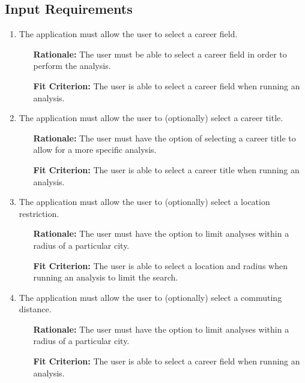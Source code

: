 \documentclass[english]{article}
\begin{document}
\subsection{Input Requirements}
\begin{enumerate}[\bf{FIR}1.]
	\item The application must allow the user to select a career field.
	\begin{enumerate}[leftmargin=1cm]
        \item [{\bf Rationale:}] The user must be able to select a career field in order to perform the analysis.
        \item [{\bf Fit Criterion:}] The user is able to select a career field when running an analysis.
	\end{enumerate}

    \item The application must allow the user to (optionally) select a career title.
	\begin{enumerate}[leftmargin=1cm]
        \item [{\bf Rationale:}] The user must have the option of selecting a career title to allow for a more specific analysis.
        \item [{\bf Fit Criterion:}] The user is able to select a career title when running an analysis.
	\end{enumerate}

    \item The application must allow the user to (optionally) select a location restriction.
	\begin{enumerate}[leftmargin=1cm]
        \item [{\bf Rationale:}] The user must have the option to limit analyses within a radius of a particular city.
        \item [{\bf Fit Criterion:}] The user is able to select a location and radius when running an analysis to limit the search.
	\end{enumerate}

    \item The application must allow the user to (optionally) select a commuting distance.
	\begin{enumerate}[leftmargin=1cm]
        \item [{\bf Rationale:}] The user must have the option to limit analyses within a radius of a particular city.
        \item [{\bf Fit Criterion:}] The user is able to select a career field when running an analysis.
	\end{enumerate}


\end{enumerate}
\end{document}
